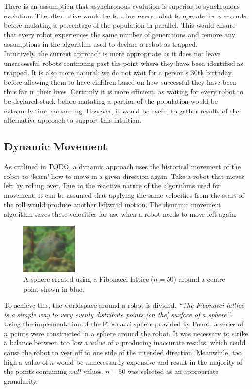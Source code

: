 \documentclass{article}
\begin{document}
There is an assumption that asynchronous evolution is superior to synchronous evolution. The alternative would be to allow every robot to operate for $x$ seconds before mutating a percentage of the population in parallel. This would ensure that every robot experiences the same number of generations and remove any assumptions in the algorithm used to declare a robot as trapped. \\
Intuitively, the current approach is more appropriate as it does not leave unsuccessful robots continuing past the point where they have been identified as trapped. It is also more natural: we do not wait for a person’s 30th birthday before allowing them to have children based on how successful they have been thus far in their lives. Certainly it is more efficient, as waiting for every robot to be declared stuck before mutating a portion of the population would be extremely time consuming. However, it would be useful to gather results of the alternative approach to support this intuition. \\

\subsection{Dynamic Movement}
As outlined in TODO, a dynamic approach uses the historical movement of the robot to ‘learn’ how to move in a given direction again. 
Take a robot that moves left by rolling over. Due to the reactive nature of the algorithms used for movement, it can be assumed that applying the same velocities from the start of the roll would produce another leftward motion. The dynamic movement algorithm saves these velocities for use when a robot needs to move left again. \\
\begin{figure}
    \centering
    \vspace*{-5mm}
    \includegraphics[width=0.25\textwidth]{spherePoints}
    \vspace*{-7mm}
    \caption{A sphere created using a Fibonacci lattice ($n=50$) around a centre point shown in blue.}
\end{figure}
To achieve this, the worldspace around a robot is divided. \textit{“The Fibonacci lattice is a simple way to very evenly distribute points [on the] surface of a sphere”}.  Using the implementation of the Fibonacci sphere provided by Fnord,  a series of $n$ points were constructed in a sphere around the robot. It was necessary to strike a balance between too low a value of $n$ producing inaccurate results, which could cause the robot to veer off to one side of the intended direction. Meanwhile, too high a value of $n$ would be unnecessarily expensive and result in the majority of the points containing $null$ values. $n=50$ was selected as an appropriate granularity.\\
\end{document}
